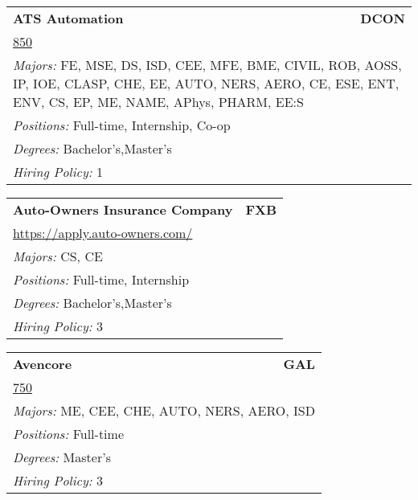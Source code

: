\documentclass[twoside]{article}
\begin{document}
\begin{center}
\begin{multicols}{3}
\begin{FlushLeft}
\begin{minipage}{\columnwidth}
\end{minipage}
 
\begin{minipage}{\columnwidth}\begin{tabularx}{.95\columnwidth}{Xr}
                 {\Large\bf ATS Automation} & {\Large\bf DCON}\\
    \multicolumn{2}{p{.95\columnwidth}}{\url{850}}\\
    \multicolumn{2}{p{.95\columnwidth}}{\emph{Majors:} FE, MSE, DS, ISD, CEE, MFE, BME, CIVIL, ROB, AOSS, IP, IOE, CLASP, CHE, EE, AUTO, NERS, AERO, CE, ESE, ENT, ENV, CS, EP, ME, NAME, APhys, PHARM, EE:S}\\
    \multicolumn{2}{p{.95\columnwidth}}{\emph{Positions:} Full-time, Internship, Co-op}\\
    \multicolumn{2}{p{.95\columnwidth}}{\emph{Degrees:} Bachelor's,Master's}\\
    \multicolumn{2}{p{.95\columnwidth}}{\emph{Hiring Policy:} 1}\\
    \end{tabularx}
    
\end{minipage}
 
\begin{minipage}{\columnwidth}\begin{tabularx}{.95\columnwidth}{Xr}
                 {\Large\bf Auto-Owners Insurance Company} & {\Large\bf FXB}\\
    \multicolumn{2}{p{.95\columnwidth}}{\url{https://apply.auto-owners.com/}}\\
    \multicolumn{2}{p{.95\columnwidth}}{\emph{Majors:} CS, CE}\\
    \multicolumn{2}{p{.95\columnwidth}}{\emph{Positions:} Full-time, Internship}\\
    \multicolumn{2}{p{.95\columnwidth}}{\emph{Degrees:} Bachelor's,Master's}\\
    \multicolumn{2}{p{.95\columnwidth}}{\emph{Hiring Policy:} 3}\\
    \end{tabularx}
    
\end{minipage}
 
\begin{minipage}{\columnwidth}\begin{tabularx}{.95\columnwidth}{Xr}
                 {\Large\bf Avencore} & {\Large\bf GAL}\\
    \multicolumn{2}{p{.95\columnwidth}}{\url{750}}\\
    \multicolumn{2}{p{.95\columnwidth}}{\emph{Majors:} ME, CEE, CHE, AUTO, NERS, AERO, ISD}\\
    \multicolumn{2}{p{.95\columnwidth}}{\emph{Positions:} Full-time}\\
    \multicolumn{2}{p{.95\columnwidth}}{\emph{Degrees:} Master's}\\
    \multicolumn{2}{p{.95\columnwidth}}{\emph{Hiring Policy:} 3}\\
    \end{tabularx}
    

\end{minipage}
\end{FlushLeft}
\end{multicols}
\end{center}
\end{document}
